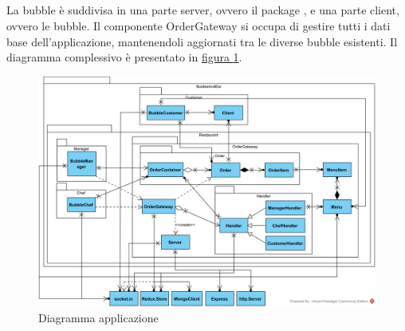 \subsection{\DemoName}\label{\class}
La bubble \DemoName{} è suddivisa in una parte server, ovvero il package \hyperref[BubbleAndEat::Restaurant::OrderGateway]{}, e una parte client, ovvero le bubble. Il componente OrderGateway si occupa di gestire tutti i dati base dell'applicazione, mantenendoli aggiornati tra le diverse bubble esistenti. Il diagramma complessivo è presentato in \hyperref[fig:bubbleandeat]{figura \ref{fig:bubbleandeat}}.
{}
\begin{landscape}
	\pagestyle{empty}
	\centering
	\begin{figure}
		\centering
		\includegraphics{./diagrammi/demo/bubbleandeat.png}
		\caption{Diagramma applicazione \DemoName{}}\label{fig:bubbleandeat}
	\end{figure}
\end{landscape}
\restoregeometry
\pagestyle{plain}

